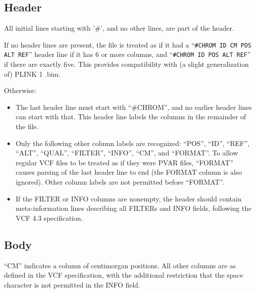 \documentclass[8pt]{article}
\begin{document}
\subsection{Header}

All initial lines starting with '\#', and no other lines, are part of the
header.

If no header lines are present, the file is treated as if it had a
``\texttt{\#CHROM ID CM POS ALT REF}'' header line if it has 6 or more columns,
and ``\texttt{\#CHROM ID POS ALT REF}'' if there are exactly five.  This
provides compatibility with (a slight generalization of) PLINK 1 .bim.

Otherwise:

\begin{itemize}
\item The last header line must start with ``\#CHROM'', and no earlier header
  lines can start with that.  This header line labels the columns in the
  remainder of the file.
\item Only the following other column labels are recognized: ``POS'', ``ID'',
  ``REF'', ``ALT'', ``QUAL'', ``FILTER'', ``INFO'', ``CM'', and ``FORMAT''.  To
  allow regular VCF files to be treated as if they were PVAR files, ``FORMAT''
  causes parsing of the last header line to end (the FORMAT column is also
  ignored).  Other column labels are not permitted before ``FORMAT''.
\item If the FILTER or INFO columns are nonempty, the header should contain
  meta-information lines describing all FILTERs and INFO fields, following the
  VCF 4.3 specification.
\end{itemize}

\subsection{Body}

``CM'' indicates a column of centimorgan positions.  All other columns are as
defined in the VCF specification, with the additional restriction that the
space character is not permitted in the INFO field.
\end{document}
